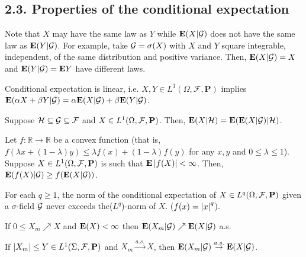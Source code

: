 \subsection*{2.3. Properties of the conditional expectation}
\begin{remark*}
Note that $X$ may have the same law as $Y$ while $\mathbf{E}(X|\mathcal{G})$ does not have the same law as $\mathbf{E}(Y|\mathcal{G})$. For example, take $\mathcal{G}=\sigma(X)$ with $X$ and $Y$ square integrable, independent, of the same distribution and positive variance. Then, $\mathbf{E}(X|\mathcal{G}) = X$ and $\mathbf{E}(Y|\mathcal{G})=\mathbf{E} Y$ have different laws.
\end{remark*}

\begin{proposition*}
Conditional expectation is linear, i.e. $X,Y\in L^1(\Omega, \mathcal F, \mathbf P)$ implies $\mathbf{E}(\alpha X + \beta Y | \mathcal{G}) = \alpha \mathbf{E} (X|\mathcal{G}) + \beta \mathbf{E}(Y|\mathcal{G})$.
\end{proposition*}

\begin{proposition*}
Suppose $\mathcal H \subseteq \mathcal{G} \subseteq \mathcal{F}$ and $X \in L^1(\Omega, \mathcal{F}, \mathbf P)$. Then, $\mathbf{E}(X|\mathcal H) = \mathbf{E}(\mathbf{E}(X|\mathcal{G})|\mathcal H)$.
\end{proposition*}


\begin{proposition*}
Let $f : \mathbb R \to \mathbb R$ be a convex function (that is, $f(\lambda x + (1-\lambda)y) \leq \lambda f(x) + (1-\lambda)f(y)$ for any $x,y$ and $0\leq\lambda\leq1$). Suppose $X \in L^1(\Omega, \mathcal{F},\mathbf P)$ is such that $\mathbf{E}\left\lvert f(X) \right\rvert < \infty$. Then, $\mathbf{E}(f(X)|\mathcal{G}) \geq f(\mathbf{E}(X|\mathcal{G}))$.
\end{proposition*}

\begin{corollary*}
For each $q \geq 1$, the norm of the conditional expectation of $X \in L^q(\Omega, \mathcal{F}, \mathbf P)$ given a $\sigma$-field $\mathcal{G}$ never exceeds the($L^q$)-norm of $X$. ($f(x) = \left\lvert x \right\rvert^q$).
\end{corollary*}

\begin{theorem*}
If $0 \leq X_m \nearrow X$ and $\mathbf{E}(X) < \infty$ then $\mathbf{E}(X_m|\mathcal{G}) \nearrow \mathbf{E}(X|\mathcal{G})$ a.s.
\end{theorem*}

\begin{theorem*}
If $\left\lvert X_m \right\rvert\leq Y \in L^1(\Sigma,\mathcal{F},\mathbf P)$ and $X_m \overset{a.s.}{\rightarrow} X$, then $\mathbf{E}(X_m|\mathcal{G}) \overset{a.s.}{\rightarrow} \mathbf{E}(X|\mathcal{G})$.
\end{theorem*}

